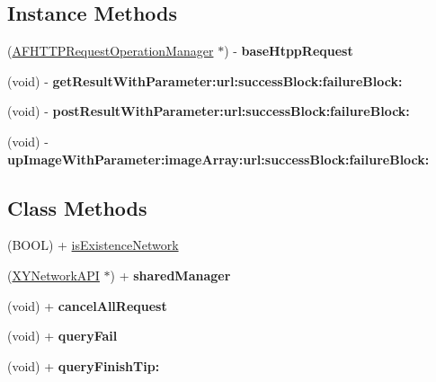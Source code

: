 \subsection*{Instance Methods}
\begin{DoxyCompactItemize}
\item 
\mbox{\label{interface_x_y_network_a_p_i_a29decf39786d9140818384bd3d4d1ab4}} 
(\mbox{\hyperlink{interface_a_f_h_t_t_p_request_operation_manager}{A\+F\+H\+T\+T\+P\+Request\+Operation\+Manager}} $\ast$) -\/ {\bfseries base\+Htpp\+Request}
\item 
\mbox{\label{interface_x_y_network_a_p_i_a517a70f862b221677c71e04f8f9d9b03}} 
(void) -\/ {\bfseries get\+Result\+With\+Parameter\+:url\+:success\+Block\+:failure\+Block\+:}
\item 
\mbox{\label{interface_x_y_network_a_p_i_a51c89eddfd11b4f9023df0c9ce6a0258}} 
(void) -\/ {\bfseries post\+Result\+With\+Parameter\+:url\+:success\+Block\+:failure\+Block\+:}
\item 
\mbox{\label{interface_x_y_network_a_p_i_a0a6ada5c9cc6aba5464450c2bc9ac700}} 
(void) -\/ {\bfseries up\+Image\+With\+Parameter\+:image\+Array\+:url\+:success\+Block\+:failure\+Block\+:}
\end{DoxyCompactItemize}
\subsection*{Class Methods}
\begin{DoxyCompactItemize}
\item 
(B\+O\+OL) + \mbox{\hyperlink{interface_x_y_network_a_p_i_a909d8575585fcb3acba406c629e1054c}{is\+Existence\+Network}}
\item 
\mbox{\label{interface_x_y_network_a_p_i_ac366c53fbbcd0e61c756fcfdfa68dc0c}} 
(\mbox{\hyperlink{interface_x_y_network_a_p_i}{X\+Y\+Network\+A\+PI}} $\ast$) + {\bfseries shared\+Manager}
\item 
\mbox{\label{interface_x_y_network_a_p_i_adc3b05a8a5c385e997a5dd3ad8cc8a9b}} 
(void) + {\bfseries cancel\+All\+Request}
\item 
\mbox{\label{interface_x_y_network_a_p_i_a1e06ccf27e6323e4180190d2bc8be3be}} 
(void) + {\bfseries query\+Fail}
\item 
\mbox{\label{interface_x_y_network_a_p_i_af0d9992aca587004a60ed9dc9706c3f9}} 
(void) + {\bfseries query\+Finish\+Tip\+:}
\end{DoxyCompactItemize}
